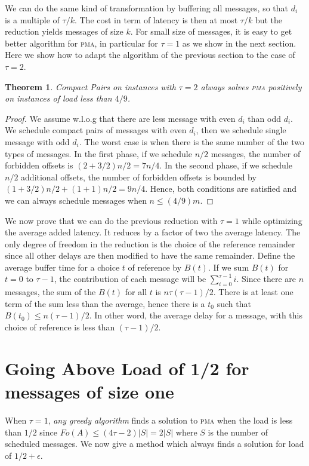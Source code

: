\documentclass[10pt, conference, letterpaper]{IEEEtran}
\newtheorem{theorem}{Theorem}
\newcommand\pma{\textsc{pma}\xspace}
\begin{document}
We can do the same kind of transformation by buffering all 
messages, so that $d_i$ is a multiple of $\tau / k$. The cost in term
of latency is then at most $\tau / k$ but the reduction yields messages of size $k$.
For small size of messages, it is easy to get better algorithm for \pma, in particular for $\tau = 1$ as we show in the next section. Here we show how to adapt the algorithm of the previous section to the case of $\tau = 2$.

\begin{theorem}
Compact Pairs on instances with $\tau =2$ always solves \pma positively on instances of load less than $4/9$.
\end{theorem}
\begin{proof}
We assume w.l.o.g that there are less message with even $d_i$ than odd $d_i$.
We schedule compact pairs of messages with even $d_i$, then we schedule single message with odd $d_i$. The worst case is when there is the same number of the two types of messages. In the first phase, if we schedule
 $n/2$ messages, the number of forbidden offsets is $(2 + 3/2)n/2 = 7n/4$. In the second phase,
 if we schedule $n/2$ additional offsets, the number of forbidden offsets is bounded by 
$ (1 + 3/2) n/2  + (1 + 1)n/2 = 9n/4$.
Hence, both conditions are satisfied and we can always schedule messages when $n \leq (4/9)m$.
\end{proof}


We now prove that we can do the previous reduction with $\tau=1$ while optimizing the average added latency. It reduces by a factor of two the average latency. The only degree of freedom in the reduction is the choice of the reference remainder since all other delays are then modified to have the same remainder.
Define the average buffer time for a choice $t$ of reference by $B(t)$. 
If we sum $B(t)$ for $t=0$ to $\tau-1$, the contribution of each message 
will be $\sum_{i=0}^{\tau-1} i$. Since there are $n$ messages, the sum of the $B(t)$ for all $t$ is $n \tau (\tau-1)/2$. There is at least one term of the sum less than the average,
hence there is a $t_0$ such that $B(t_0) \leq n (\tau-1)/2$. In other word, the average
delay for a message, with this choice of reference is less than $(\tau -1)/2$.


\section{Going Above Load of 1/2 for messages of size one}

When $\tau = 1$, \emph{any greedy algorithm} finds a solution to \pma when the load is less than $1/2$ since $Fo(A) \leq (4\tau -2)|S| = 2|S|$ where $S$ is the number of scheduled messages. We now give a method which always finds a solution for load of $1/2 + \epsilon$.
\end{document}
